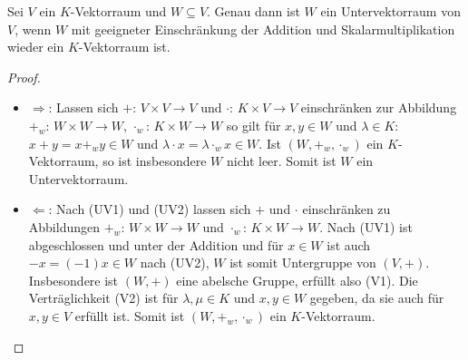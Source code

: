 \begin{proposition}
	Sei $V$ ein $K$-Vektorraum und $W \subseteq V$. Genau dann ist $W$ ein Untervektorraum von $V$, wenn $W$ mit geeigneter
	Einschränkung der Addition und Skalarmultiplikation wieder ein $K$-Vektorraum ist.
\end{proposition}
\begin{proof}
	\begin{itemize}
		\item $\Rightarrow$: Lassen sich $+$: $V \times V \to V$ und $\cdot$: $K \times V \to V$ einschränken zur Abbildung $+_w$: $W
		\times W \to W$, $\cdot_w$: $K \times W \to W$ so gilt für $x,y \in W$ und $\lambda \in K$: $x+y=x +_w y \in W$ und
		$\lambda\cdot x=\lambda \cdot_w x \in W$. Ist $(W,+_w,\cdot_w)$ ein $K$-Vektorraum, so ist insbesondere $W$ nicht leer. Somit
		ist $W$ ein Untervektorraum.
		\item $\Leftarrow$: Nach (UV1) und (UV2) lassen sich $+$ und $\cdot$ einschränken zu Abbildungen $+_w$: $W \times W \to W$ und 
		$\cdot_w$: $K \times W \to W$. Nach (UV1) ist abgeschlossen und unter der Addition und für $x \in W$ ist auch $-x=
		(-1)x \in W$ nach (UV2), $W$ ist somit Untergruppe von $(V,+)$. Insbesondere ist $(W,+)$ eine abelsche Gruppe, erfüllt 
		also (V1). Die Verträglichkeit (V2) ist für $\lambda,\mu \in K$ und $x,y \in W$ gegeben, da sie auch für $x,y \in V$ 
		erfüllt ist. Somit ist $(W,+_w,\cdot_w)$ ein $K$-Vektorraum.
	\end{itemize}
\end{proof}

